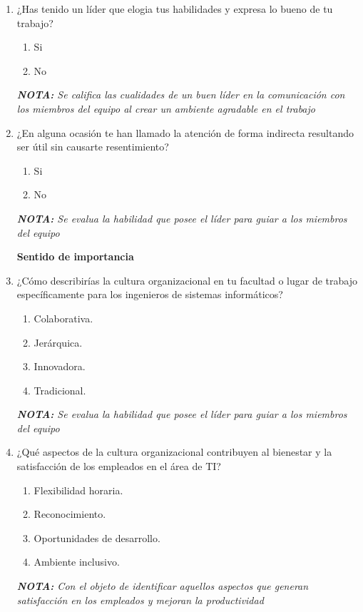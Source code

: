 \documentclass[journal]{IEEEtran}
\begin{document}
\begin{enumerate}
	\item ¿Has tenido un líder que elogia tus habilidades y expresa lo bueno de tu trabajo?
	\begin{enumerate}
		\item Si
		\item No
	\end{enumerate}
	\textit{\textbf{NOTA:} Se califica las cualidades de un buen líder en la comunicación con los miembros del equipo al crear un ambiente agradable en el trabajo}
	
	\item ¿En alguna ocasión te han llamado la atención de forma indirecta resultando ser útil sin causarte resentimiento?
	\begin{enumerate}
		\item Si
		\item No
	\end{enumerate}
	\textit{\textbf{NOTA:} Se evalua la habilidad que posee el líder para guiar a los miembros del equipo}
	
	\begin{center}
		\textbf{Sentido de importancia}
	\end{center}
	
	\item ¿Cómo describirías la cultura organizacional en tu facultad o lugar de trabajo específicamente para los ingenieros de sistemas informáticos?
	\begin{enumerate}
		\item Colaborativa.
		\item Jerárquica.
		\item Innovadora.
		\item Tradicional.
	\end{enumerate}
	\textit{\textbf{NOTA:} Se evalua la habilidad que posee el líder para guiar a los miembros del equipo}
	
	\item ¿Qué aspectos de la cultura organizacional contribuyen al bienestar y la satisfacción de los empleados en el área de TI?
	\begin{enumerate}
		\item Flexibilidad horaria.
		\item Reconocimiento.
		\item Oportunidades de desarrollo.
		\item Ambiente inclusivo.
	\end{enumerate}
	\textit{\textbf{NOTA:} Con el objeto de identificar aquellos aspectos que generan satisfacción en los empleados y mejoran la productividad}
	

\end{enumerate}
\end{document}
